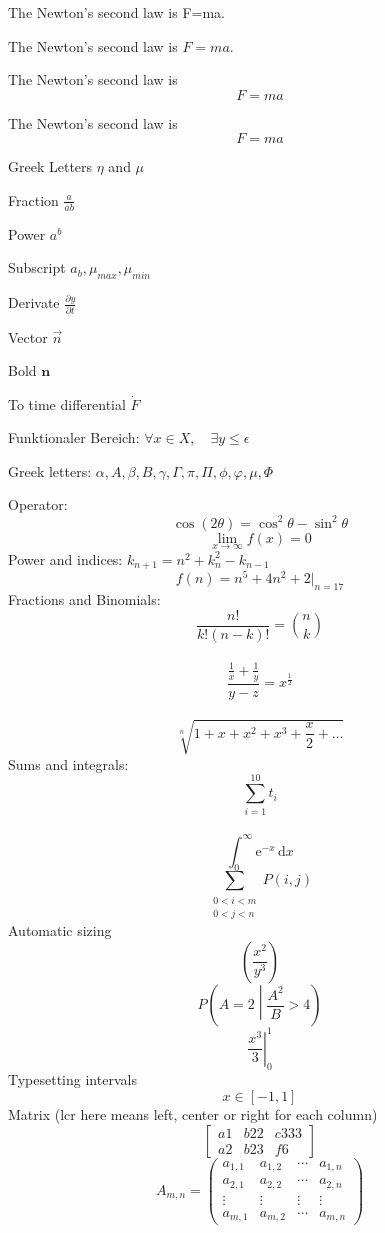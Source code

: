 \documentclass{article}
\begin{document}
  The Newton's second law is F=ma.

  The Newton's second law is $F=ma$.

  The Newton's second law is
  $$F=ma$$

  The Newton's second law is
  \[F=ma\]

  Greek Letters $\eta$ and $\mu$

  Fraction $\frac{a}{ab}$

  Power $a^b$

  Subscript $a_b, \mu_{max}, \mu_{min}$

  Derivate $\frac{\partial y}{\partial t} $

  Vector $\vec{n}$

  Bold $\mathbf{n}$

  To time differential $\dot{F}$
  
  Funktionaler Bereich: $\forall x \in X, \quad\exists y\leq \epsilon$
  
  Greek letters: $\alpha, A, \beta, B, \gamma, \Gamma, \pi, \Pi, \phi, \varphi, \mu, \Phi$
  
  Operator: $$\cos(2\theta) = \cos^2\theta - \sin^2\theta$$
            $$\lim_{x\to\infty} f(x) = 0 $$
  Power and indices: $k_{n+1} = n^2 + k_n^2 - k_{n-1}$\\
                     $$f(n) = n^5 + 4n^2 + 2 |_{n=17}$$
  Fractions and Binomials:  
  $$\frac{n!}{k!(n-k)!} = \binom{n}{k}$$\\
  $$\frac{\frac{1}{x}+\frac{1}{y}}{y-z} = x^\frac{1}{2} $$\\ 
  $$\sqrt[n]{1+x+x^2+x^3+\frac{x}{2}+\ldots}$$
  Sums and integrals:
  $$\displaystyle\sum_{i=1}^{10} t_i$$\\
  $$\int_0^\infty\mathrm{e}^{-x}\,\mathrm{d}x$$
  $$\sum_{\substack{0<i<m\\0<j<n}} P(i,j)$$
  Automatic sizing
  $$\left(\frac{x^2}{y^3}\right)$$
  $$P\left(A=2\middle|\frac{A^2}{B}>4\right)$$
  $$\left.\frac{x^3}{3}\right|_0^1$$   
  Typesetting intervals
  $$x\in[-1,1]$$
  Matrix (lcr here means left, center or right for each column)
  \[
    \left[
      \begin{array}{lcr}
        a1 & b22 & c333 \\
        a2 & b23 & f6
      \end{array}
    \right]
  \]
$$ A_{m,n} = 
  \begin{pmatrix}
  	a_{1,1} & a_{1,2} & \cdots & a_{1,n}\\
  	a_{2,1} & a_{2,2} & \cdots & a_{2,n}\\
  	\vdots  & \vdots  & \vdots & \vdots \\
  	a_{m,1} & a_{m,2} & \cdots & a_{m,n}
  \end{pmatrix}$$
  
\end{document}
